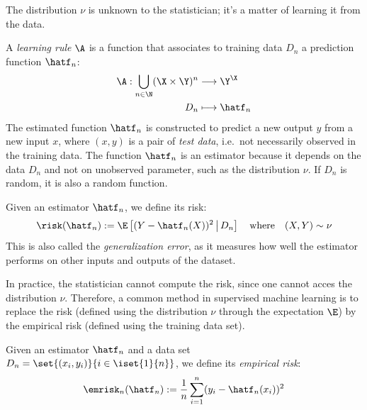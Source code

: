 \documentclass{../cs-classes/cs-classes}
\begin{document}
The distribution $\nu$ is unknown to the statistician; it's a matter of learning it from the data.

\begin{definition}
    A \emph{learning rule} $\A$ is a function that associates to training data $D_n$ a prediction function $\hatf_n$:
    \begin{equation*}
        \begin{aligned}
            \A: \bigcup_{n\in\N} (\X\times\Y)^n &\longrightarrow \Y^\X\\
            D_n &\longmapsto \hatf_n
        \end{aligned}
    \end{equation*}
    The estimated function $\hatf_n$ is constructed to predict a new output $y$ from a new input $x$, where $(x, y)$ is a pair of \emph{test data}, i.e.~not necessarily observed in the training data. The function $\hatf_n$ is an estimator because it depends on the data $D_n$ and not on unobserved parameter, such as the distribution $\nu$. If $D_n$ is random, it is also a random function.
\end{definition}

\begin{definition}
    Given an estimator $\hatf_n$, we define its risk:
    \begin{equation}
        \label{eq:sq-risk}
        \risk(\hatf_n) := \E\left[(Y-\hatf_n(X))^2\,\big| \, D_n\right] \quad \textnormal{where} \quad (X, Y)\sim\nu
    \end{equation}
    This is also called the \emph{generalization error}, as it measures how well the estimator performs on other inputs and outputs of the dataset.
\end{definition}

In practice, the statistician cannot compute the risk, since one cannot acces the distribution $\nu$. Therefore, a common method in supervised machine learning is to replace the risk (defined using the distribution $\nu$ through the expectation $\E$) by the empirical risk (defined using the training data set).

\begin{definition}
    Given an estimator $\hatf_n$ and a data set $D_n=\set{(x_i, y_i)}{i\in\iset{1}{n}}$, we define its \emph{empirical risk}:
    \begin{equation}
        \label{eq:sq-empirical-risk}
        \emrisk_n(\hatf_n) := \frac{1}{n}\sum_{i=1}^n (y_i-\hatf_n(x_i))^2
    \end{equation}
\end{definition}
\end{document}
